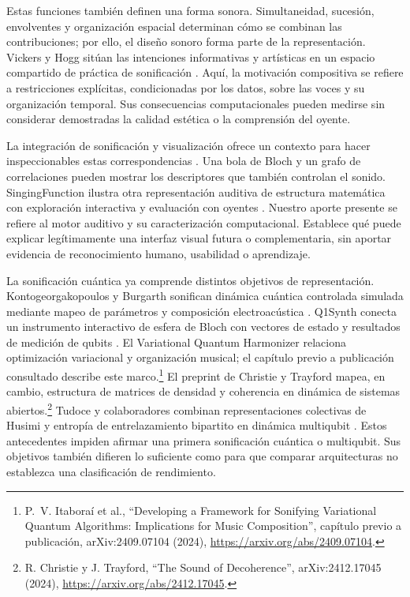 \documentclass[pdflatex,iicol,sn-basic,Numbered]{sn-jnl}
\begin{document}
Estas funciones también definen una forma sonora. Simultaneidad, sucesión, envolventes y organización espacial determinan cómo se combinan las contribuciones; por ello, el diseño sonoro forma parte de la representación. Vickers y Hogg sitúan las intenciones informativas y artísticas en un espacio compartido de práctica de sonificación \citep{VickersHogg2006}. Aquí, la motivación compositiva se refiere a restricciones explícitas, condicionadas por los datos, sobre las voces y su organización temporal. Sus consecuencias computacionales pueden medirse sin considerar demostradas la calidad estética o la comprensión del oyente.

La integración de sonificación y visualización ofrece un contexto para hacer inspeccionables estas correspondencias \citep{Enge2024}. Una bola de Bloch y un grafo de correlaciones pueden mostrar los descriptores que también controlan el sonido. SingingFunction ilustra otra representación auditiva de estructura matemática con exploración interactiva y evaluación con oyentes \citep{GrondHermann2012}. Nuestro aporte presente se refiere al motor auditivo y su caracterización computacional. Establece qué puede explicar legítimamente una interfaz visual futura o complementaria, sin aportar evidencia de reconocimiento humano, usabilidad o aprendizaje.

La sonificación cuántica ya comprende distintos objetivos de representación. Kontogeorgakopoulos y Burgarth sonifican dinámica cuántica controlada simulada mediante mapeo de parámetros y composición electroacústica \citep{Kontogeorgakopoulos2014}. Q1Synth conecta un instrumento interactivo de esfera de Bloch con vectores de estado y resultados de medición de qubits \citep{Miranda2023}. El Variational Quantum Harmonizer relaciona optimización variacional y organización musical; el capítulo previo a publicación consultado describe este marco.\footnote{P.~V. Itabora\'i et al., ``Developing a Framework for Sonifying Variational Quantum Algorithms: Implications for Music Composition'', capítulo previo a publicación, arXiv:2409.07104 (2024), \url{https://arxiv.org/abs/2409.07104}.} El preprint de Christie y Trayford mapea, en cambio, estructura de matrices de densidad y coherencia en dinámica de sistemas abiertos.\footnote{R. Christie y J. Trayford, ``The Sound of Decoherence'', arXiv:2412.17045 (2024), \url{https://arxiv.org/abs/2412.17045}.} Tudoce y colaboradores combinan representaciones colectivas de Husimi y entropía de entrelazamiento bipartito en dinámica multiqubit \citep{Tudoce2026}. Estos antecedentes impiden afirmar una primera sonificación cuántica o multiqubit. Sus objetivos también difieren lo suficiente como para que comparar arquitecturas no establezca una clasificación de rendimiento.
\end{document}
